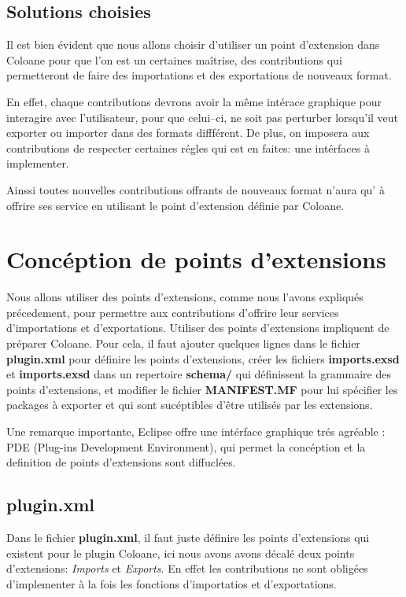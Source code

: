 \documentclass{article}
\begin{document}
\subsection{Solutions choisies}
Il est bien évident que nous allons choisir d'utiliser un point d'extension dans 
Coloane pour que l'on est un certaines maîtrise, des contributions qui permetteront 
de faire des importations et des exportations de nouveaux format.

En effet, chaque contributions devrons avoir la même intérace graphique pour 
interagire avec l'utilisateur, pour que celui--ci, ne soit pas perturber 
lorsqu'il veut exporter ou importer dans des formats diffférent. De plus, on 
imposera aux contributions de respecter certaines régles qui est en faites: 
une intérfaces à implementer.

Ainssi toutes nouvelles contributions offrants de nouveaux format n'aura qu' à 
offrire ses service en utilisant le point d'extension définie par Coloane.


\newpage

\section{Concéption de points d'extensions}
Nous allons utiliser des points d'extensions, comme nous l'avons expliqués précedement, 
pour permettre aux contributions d'offrire leur services d'importations et 
d'exportations. Utiliser des points d'extensions impliquent de préparer Coloane. Pour cela, 
il faut ajouter quelques lignes dans le fichier \textbf{plugin.xml} pour définire les points 
d'extensions, créer les fichiers \textbf{imports.exsd} et \textbf{imports.exsd } dans un 
repertoire \textbf{schema/} qui définissent la grammaire des points d'extensions, et 
modifier le fichier \textbf{MANIFEST.MF} pour lui spécifier les packages à exporter et 
qui sont sucéptibles d'être utilisés par les extensions.

Une remarque importante, Eclipse offre une intérface graphique trés agréable : 
PDE (Plug-ins Development Environment), qui permet  la concéption et la definition de points d'extensions sont 
diffuclées.

\subsection{\textbf{plugin.xml}}
Dans le fichier \textbf{plugin.xml}, il faut juste définire les points d'extensions 
qui existent pour le plugin Coloane, ici nous avons avons décalé deux points
d'extensions: \textit{Imports} et \textit{Exports}. En effet les contributions ne sont obligées d'implementer à la fois 
les fonctions d'importatios et d'exportations.
\end{document}
